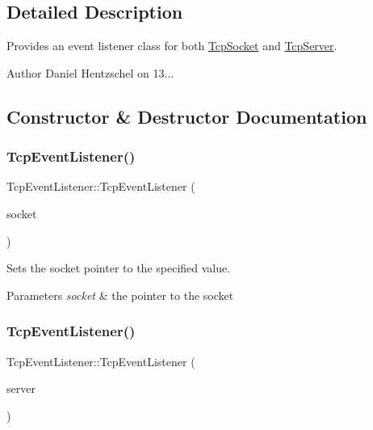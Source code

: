 \subsection{Detailed Description}
Provides an event listener class for both \mbox{\hyperlink{class_tcp_socket}{Tcp\+Socket}} and \mbox{\hyperlink{class_tcp_server}{Tcp\+Server}}. 

\begin{DoxyAuthor}{Author}
Daniel Hentzschel on 13... 
\end{DoxyAuthor}


\subsection{Constructor \& Destructor Documentation}
\mbox{\label{class_tcp_event_listener_a3d6f7243d828830ed9373a2e488c95b6}} 
\subsubsection{\texorpdfstring{TcpEventListener()}{TcpEventListener()}\hspace{0.1cm}{\footnotesize\ttfamily [1/2]}}
{\footnotesize\ttfamily Tcp\+Event\+Listener\+::\+Tcp\+Event\+Listener (\begin{DoxyParamCaption}\item[{\mbox{\hyperlink{class_tcp_socket}{Tcp\+Socket}} $\ast$}]{socket }\end{DoxyParamCaption})\hspace{0.3cm}{\ttfamily [explicit]}}



Sets the socket pointer to the specified value. 


\begin{DoxyParams}{Parameters}
{\em socket} & the pointer to the socket \\
\hline
\end{DoxyParams}
\mbox{\label{class_tcp_event_listener_aba0cb36a5016a7c081b277ff4030fbf6}} 
\subsubsection{\texorpdfstring{TcpEventListener()}{TcpEventListener()}\hspace{0.1cm}{\footnotesize\ttfamily [2/2]}}
{\footnotesize\ttfamily Tcp\+Event\+Listener\+::\+Tcp\+Event\+Listener (\begin{DoxyParamCaption}\item[{\mbox{\hyperlink{class_tcp_server}{Tcp\+Server}} $\ast$}]{server }\end{DoxyParamCaption})\hspace{0.3cm}{\ttfamily [explicit]}}




